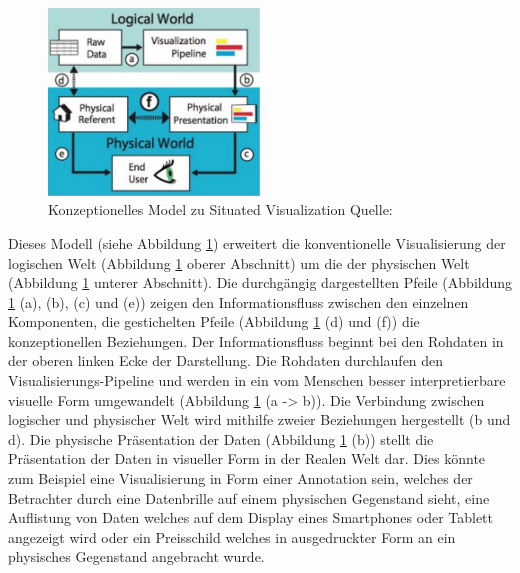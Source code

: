 \begin{figure}[H]
	\centering
	\includegraphics[width=0.5\textwidth]{resources/fundamentals/situated_visualization/spacially_situated_visualization_model.png}
	\caption{Konzeptionelles Model zu Situated Visualization Quelle: \cite[S.~192]{ElSayedNevenA.M.BruceH.ThomasRossT.Smith2015}}
	\label{img:situated_visualization_concept}
\end{figure}

Dieses Modell (siehe Abbildung \ref{img:situated_visualization_concept}) erweitert die konventionelle Visualisierung der logischen Welt (Abbildung \ref{img:situated_visualization_concept} oberer Abschnitt) um die der physischen Welt (Abbildung \ref{img:situated_visualization_concept} unterer Abschnitt). 
Die durchgängig dargestellten Pfeile (Abbildung \ref{img:situated_visualization_concept} (a), (b), (c) und (e)) zeigen den Informationsfluss zwischen den einzelnen Komponenten, die gestichelten Pfeile (Abbildung \ref{img:situated_visualization_concept} (d) und (f)) die konzeptionellen Beziehungen. Der Informationsfluss beginnt bei den Rohdaten in der oberen linken Ecke der Darstellung. Die Rohdaten durchlaufen den Visualisierungs-Pipeline und werden in ein vom Menschen besser interpretierbare visuelle Form umgewandelt (Abbildung \ref{img:situated_visualization_concept} (a -> b)). Die Verbindung zwischen logischer und physischer Welt wird mithilfe zweier Beziehungen hergestellt (b und d). 
Die physische Präsentation der Daten (Abbildung \ref{img:situated_visualization_concept} (b)) stellt die Präsentation der Daten in visueller Form in der Realen Welt dar. 
Dies könnte zum Beispiel eine Visualisierung in Form einer Annotation sein, welches der Betrachter durch eine Datenbrille auf einem physischen Gegenstand sieht, eine Auflistung von Daten welches 
auf dem  Display eines Smartphones oder Tablett angezeigt wird oder ein Preisschild welches in ausgedruckter Form an ein physisches Gegenstand angebracht wurde.

